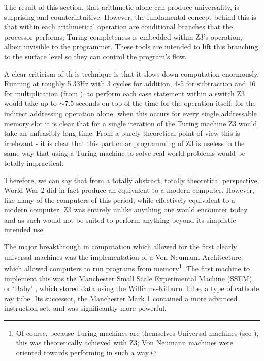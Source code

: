 \documentclass[Master.tex]{subfiles}
\begin{document}
The result of this section, that arithmetic alone can produce universality, is surprising and counterintuitive. However, the fundamental concept behind this is that within each arithmetical operation are conditional branches that the processor performs; Turing-completeness is embedded within Z3's operation, albeit invisible to the programmer. These tools are intended to lift this branching to the surface level so they can control the program's flow.

A clear criticism of th  is technique is that it slows down computation enormously. Running at roughly 5.33Hz with 3 cycles for addition, 4-5 for subtraction and 16 for multiplication (from \cite{rojas1997z3architecture}), to perform each case statement within a switch Z3 would take up to $\sim$7.5 seconds on top of the time for the operation itself; for the indirect addressing operation alone, when this occurs for every single addressable memory slot it is clear that for a single iteration of the Turing machine Z3 would take an unfeasibly long time. From a purely theoretical point of view this is irrelevant - it is clear that this particular programming of Z3 is useless in the same way that using a Turing machine to solve real-world problems would be totally impractical.

Therefore, we can say that from a totally abstract, totally theoretical perspective, World War 2 did in fact produce an equivalent to a modern computer. However, like many of the computers of this period, while effectively equivalent to a modern computer, Z3 was entirely unlike anything one would encounter today and as such would not be suited to perform anything beyond its simplistic intended use.

The major breakthrough in computation which allowed for the first clearly universal machines was the implementation of a Von Neumann Architecture, which allowed computers to run programs from memory\footnote{Of course, because Turing machines are themselves Universal machines (see \cite{turing1936computablenumbers}), this was theoretically achieved with Z3; Von Neumann machines were oriented towards performing in such a way.}. The first machine to implement this was the Manchester Small Scale Experimental Machine (SSEM), or `Baby' \cite{napperWEB17baby}, which stored data using the Williams-Kilburn Tube, a type of cathode ray tube. Its successor, the Manchester Mark 1 contained a more advanced instruction set, and was significantly more powerful.
\end{document}
